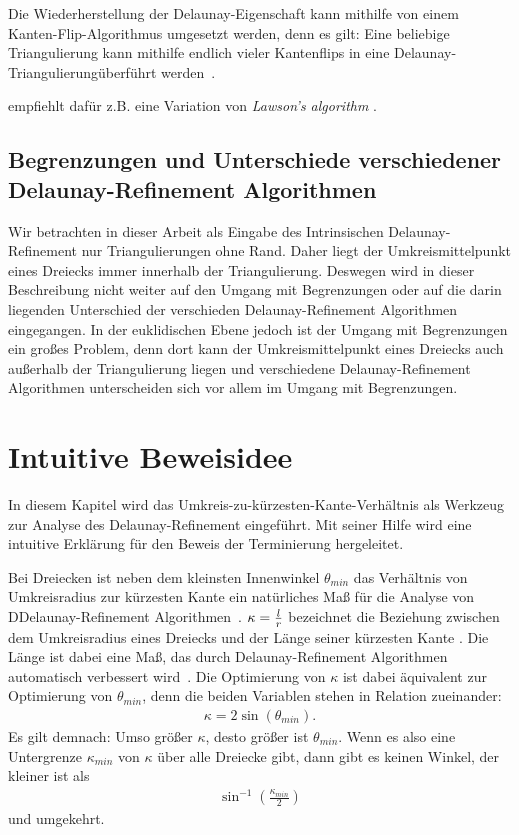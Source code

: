 Die Wiederherstellung der Delaunay-Eigenschaft kann mithilfe von einem Kanten-Flip-Algorithmus umgesetzt werden, denn es gilt: Eine beliebige Triangulierung kann mithilfe endlich vieler Kantenflips in eine Delaunay-Triangulierungüberführt werden~\citet{shewchuk:1997:delaunay}.

\citeauthor{SHEWCHUK:2002:chuws} empfiehlt dafür z.B. eine Variation von \textit{Lawson’s algorithm} \cite{lawson:1977:lawson-algorithmus}. 

\subsection*{Begrenzungen und Unterschiede verschiedener Delaunay-Refinement Algorithmen}
Wir betrachten in dieser Arbeit als Eingabe des Intrinsischen Delaunay-Refinement nur  Triangulierungen ohne Rand. Daher liegt der Umkreismittelpunkt eines Dreiecks immer innerhalb der Triangulierung. Deswegen wird in dieser Beschreibung nicht weiter auf den Umgang mit Begrenzungen oder auf die darin liegenden Unterschied der verschieden Delaunay-Refinement Algorithmen eingegangen. In der euklidischen Ebene jedoch ist der Umgang mit Begrenzungen ein großes Problem, denn dort kann der Umkreismittelpunkt eines Dreiecks auch außerhalb der Triangulierung liegen und verschiedene Delaunay-Refinement Algorithmen unterscheiden sich vor allem im Umgang mit Begrenzungen. 

\newpage
\section*{Intuitive Beweisidee}

In diesem Kapitel wird das Umkreis-zu-kürzesten-Kante-Verhältnis als Werkzeug zur Analyse des Delaunay-Refinement eingeführt. Mit seiner Hilfe wird eine intuitive Erklärung für den Beweis der Terminierung hergeleitet. 



Bei Dreiecken ist neben dem kleinsten Innenwinkel  $\theta_{min}$  das Verhältnis von Umkreisradius zur kürzesten Kante ein natürliches Maß für die Analyse von DDelaunay-Refinement Algorithmen~\cite{MiTaTeWa1995ACM}. $\kappa = \frac{\kuezesteKante*}{ \umkreisradius*}$ bezeichnet die Beziehung zwischen dem Umkreisradius \umkreisradius eines Dreiecks und der Länge seiner kürzesten Kante \kuezesteKante. Die Länge \kuezesteKante ist dabei eine Maß, das durch Delaunay-Refinement Algorithmen automatisch verbessert wird~\cite{SHEWCHUK:2002:chuws}. Die Optimierung von $\kappa$ ist dabei äquivalent zur Optimierung von  $\theta_{min}$, denn die beiden Variablen stehen in Relation zueinander:
\begin{align*}
 \kappa = 2\sin(\theta_{min}).   
\end{align*}
Es gilt demnach: Umso größer $\kappa$, desto größer ist $\theta_{min}$. Wenn es also eine Untergrenze $\kappa_{min}$ von $\kappa$ über alle Dreiecke  gibt, dann gibt es keinen Winkel, der kleiner ist als \begin{align*}
    \sin^{-1}(\frac{\kappa_{min}}{2 })
\end{align*} und umgekehrt. 

